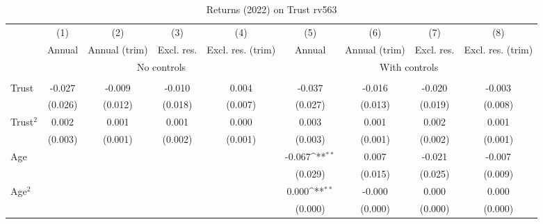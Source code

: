 \begin{table}[htbp]\centering
\def\sym#1{\ifmmode^{#1}\else\(^{#1}\)\fi}
\caption{Returns (2022) on Trust rv563}
\begin{tabular}{l*{8}{c}}
\toprule
          &\multicolumn{1}{c}{(1)}&\multicolumn{1}{c}{(2)}&\multicolumn{1}{c}{(3)}&\multicolumn{1}{c}{(4)}&\multicolumn{1}{c}{(5)}&\multicolumn{1}{c}{(6)}&\multicolumn{1}{c}{(7)}&\multicolumn{1}{c}{(8)}\\
          &\multicolumn{1}{c}{Annual}&\multicolumn{1}{c}{Annual (trim)}&\multicolumn{1}{c}{Excl. res.}&\multicolumn{1}{c}{Excl. res. (trim)}&\multicolumn{1}{c}{Annual}&\multicolumn{1}{c}{Annual (trim)}&\multicolumn{1}{c}{Excl. res.}&\multicolumn{1}{c}{Excl. res. (trim)}\\
& \multicolumn{4}{c}{No controls} & \multicolumn{4}{c}{With controls} \\\\ \cmidrule(lr){2-5}\cmidrule(lr){6-9}
Trust     &   -0.027         &   -0.009         &   -0.010         &    0.004         &   -0.037         &   -0.016         &   -0.020         &   -0.003         \\
          &  (0.026)         &  (0.012)         &  (0.018)         &  (0.007)         &  (0.027)         &  (0.013)         &  (0.019)         &  (0.008)         \\
Trust$^{2}$&    0.002         &    0.001         &    0.001         &    0.000         &    0.003         &    0.001         &    0.002         &    0.001         \\
          &  (0.003)         &  (0.001)         &  (0.002)         &  (0.001)         &  (0.003)         &  (0.001)         &  (0.002)         &  (0.001)         \\
Age       &                  &                  &                  &                  &   -0.067\sym{**} &    0.007         &   -0.021         &   -0.007         \\
          &                  &                  &                  &                  &  (0.029)         &  (0.015)         &  (0.025)         &  (0.009)         \\
Age$^{2}$ &                  &                  &                  &                  &    0.000\sym{**} &   -0.000         &    0.000         &    0.000         \\
          &                  &                  &                  &                  &  (0.000)         &  (0.000)         &  (0.000)         &  (0.000)         \\

\end{tabular}
\end{table}

